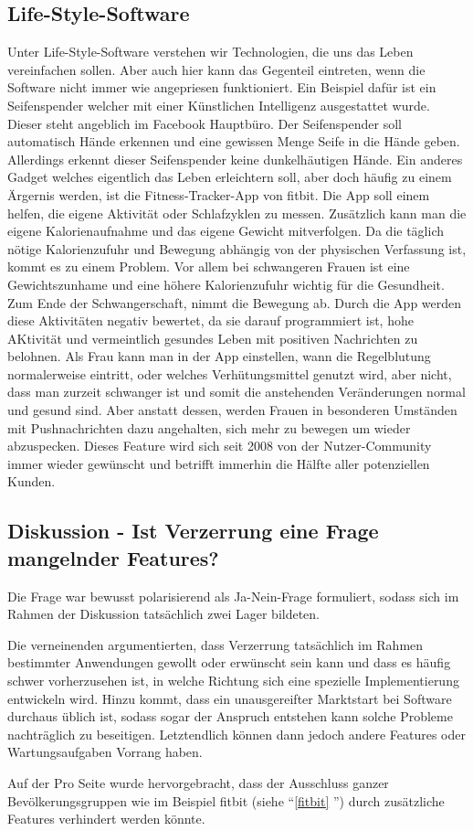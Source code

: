 \subsection{Life-Style-Software}
Unter Life-Style-Software verstehen wir Technologien, die uns das Leben vereinfachen sollen. Aber auch hier kann das Gegenteil eintreten, wenn die Software nicht immer wie angepriesen funktioniert. 
Ein Beispiel dafür ist ein Seifenspender welcher mit einer Künstlichen Intelligenz ausgestattet wurde. Dieser steht angeblich im Facebook Hauptbüro. 
Der Seifenspender soll automatisch Hände erkennen und eine gewissen Menge Seife in die Hände geben. Allerdings erkennt dieser Seifenspender keine dunkelhäutigen Hände. \newline 
\label{fitbit}
Ein anderes Gadget welches eigentlich das Leben erleichtern soll, aber doch häufig zu einem Ärgernis werden, ist die Fitness-Tracker-App von fitbit. Die App soll einem helfen, die eigene Aktivität oder Schlafzyklen zu messen. Zusätzlich kann man die eigene Kalorienaufnahme und das eigene Gewicht mitverfolgen. Da die täglich nötige Kalorienzufuhr und Bewegung abhängig von der physischen Verfassung ist, kommt es zu einem Problem. Vor allem bei schwangeren Frauen ist eine Gewichtszunhame und eine höhere Kalorienzufuhr wichtig für die Gesundheit. Zum Ende der Schwangerschaft, nimmt die Bewegung ab. Durch die App werden diese Aktivitäten negativ bewertet, da sie darauf programmiert ist, hohe AKtivität und vermeintlich gesundes Leben mit positiven Nachrichten zu belohnen. 
Als Frau kann man in der App einstellen, wann die Regelblutung normalerweise eintritt, oder welches Verhütungsmittel genutzt wird, aber nicht, dass man zurzeit schwanger ist und somit die anstehenden Veränderungen normal und gesund sind. 
Aber anstatt dessen, werden Frauen in besonderen Umständen mit Pushnachrichten dazu angehalten, sich mehr zu bewegen um wieder abzuspecken. 
Dieses Feature wird sich seit 2008 von der Nutzer-Community immer wieder gewünscht und betrifft immerhin die Hälfte aller potenziellen Kunden. 


\subsection[feature]{Diskussion - Ist Verzerrung eine Frage mangelnder Features?}
Die Frage war bewusst polarisierend als Ja-Nein-Frage formuliert, sodass sich im Rahmen der Diskussion tatsächlich zwei Lager bildeten.

Die verneinenden argumentierten, dass Verzerrung tatsächlich im Rahmen bestimmter Anwendungen gewollt oder erwünscht sein kann und dass es häufig schwer vorherzusehen ist, in welche Richtung sich eine spezielle Implementierung entwickeln wird. Hinzu kommt, dass ein unausgereifter Marktstart bei Software durchaus üblich ist, sodass sogar der Anspruch entstehen kann solche Probleme nachträglich zu beseitigen. Letztendlich können dann jedoch andere Features oder Wartungsaufgaben Vorrang haben.

Auf der Pro Seite wurde hervorgebracht, dass der Ausschluss ganzer Bevölkerungsgruppen wie im Beispiel fitbit (siehe \enquote{\ref{fitbit} }) durch zusätzliche Features verhindert werden könnte.

